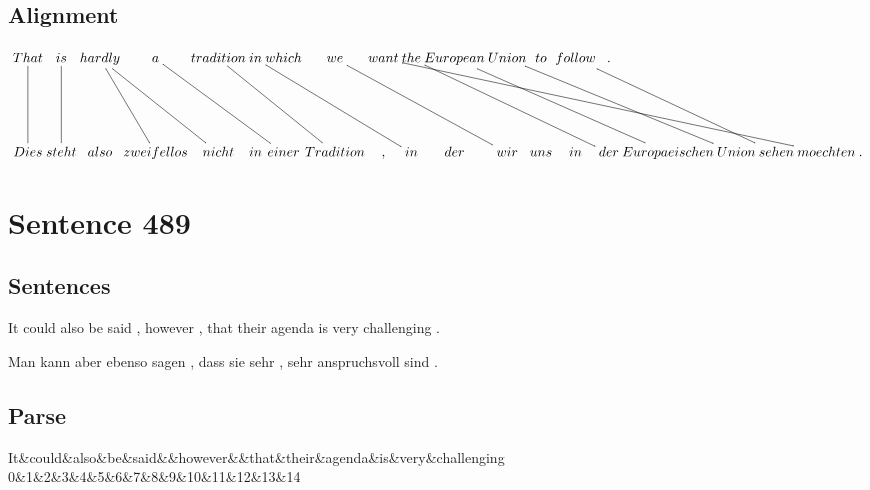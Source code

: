 \documentclass{report}
\begin{document}
\subsection*{Alignment}
\scriptsize{
$
\xymatrix@C-2.3pc{
That \ar @{-} [dd] & is \ar @{-} [dd] & hardly \ar @{-} [ddrr] \ar @{-} [ddr] & a \ar @{-} [ddrrr] & tradition \ar @{-} [ddrrr] & in \ar @{-} [ddrrrr] & which & we \ar @{-} [ddrrrr] & want \ar @{-} [ddrrrrrrrrrr] & the \ar @{-} [ddrrrrr] & European \ar @{-} [ddrrrrr] & Union \ar @{-} [ddrrrrr] & to & follow \ar @{-} [ddrrrr] & .\\\\
Dies & steht & also & zweifellos & nicht & in & einer & Tradition & , & in & der & wir & uns & in & der & Europaeischen & Union & sehen & moechten & .
}$}
\newpage\section*{Sentence 489}

\subsection*{Sentences}
It could also be said , however , that their agenda is very challenging .

\noindent Man kann aber ebenso sagen , dass sie sehr , sehr anspruchsvoll sind .



\subsection*{Parse}
\begin{dependency}[theme=simple]
\begin{deptext}[column sep=.5cm, row sep=.1ex]
It\&could\&also\&be\&said\&\&however\&\&that\&their\&agenda\&is\&very\&challenging\\
0\&1\&2\&3\&4\&5\&6\&7\&8\&9\&10\&11\&12\&13\&14\\
\end{deptext}
\end{dependency}
\end{document}
